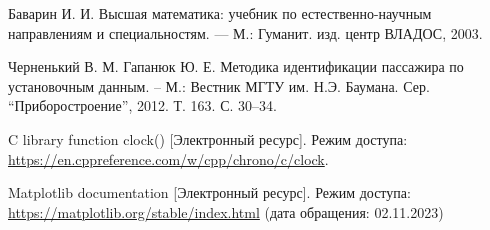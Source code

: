 %
%



\renewcommand\bibname{Список использованных источников}
\begin{thebibliography}{}
	 Баварин И. И. Высшая математика: учебник по естественно-научным направлениям и специальностям. — М.: Гуманит. изд. центр ВЛАДОС, 2003.
	
	 Черненький В. М. Гапанюк Ю. Е. Методика идентификации пассажира по установочным данным. – М.: Вестник МГТУ им. Н.Э. Баумана. Сер. “Приборостроение”, 2012. Т. 163. С. 30–34.
	
	 C library function clock() [Электронный ресурс]. Режим доступа: \url{https://en.cppreference.com/w/cpp/chrono/c/clock}.
	
	 Matplotlib documentation [Электронный ресурс]. Режим доступа: \url{https://matplotlib.org/stable/index.html} (дата обращения: 02.11.2023)
	
\end{thebibliography}